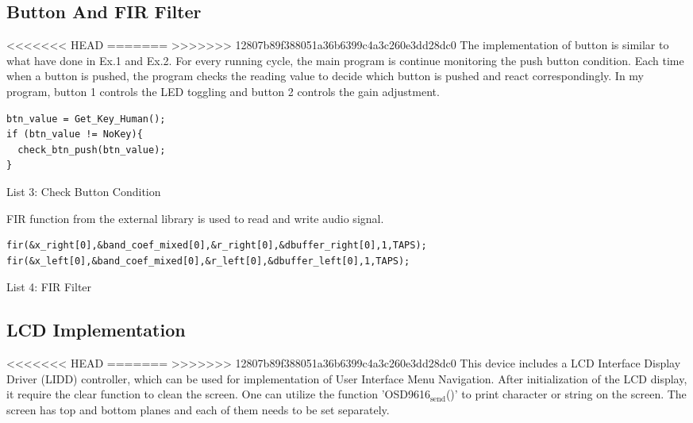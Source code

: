 \documentclass[titlepage]{article}
\begin{document}
\subsection{Button And FIR Filter}
<<<<<<< HEAD
\label{sec:orgec88205}
=======
\label{sec:orge8d06d4}
>>>>>>> 12807b89f388051a36b6399c4a3c260e3dd28dc0
The implementation of button is similar to what have done in
Ex.1 and Ex.2. For every running cycle, the main program is continue
monitoring the push button condition. Each time when a button is pushed, the
program checks the reading value to decide which button is pushed and react
correspondingly. In my program, button 1 controls the LED toggling and button
2 controls the gain adjustment.

\begin{listing}
\begin{verbatim}
btn_value = Get_Key_Human();
if (btn_value != NoKey){
  check_btn_push(btn_value);
}
\end{verbatim}
\centering
\caption{List 3: Check Button Condition}
\newline
\end{listing}

FIR function from the external library is used to read and write audio signal. 

\begin{listing}
\begin{verbatim}
fir(&x_right[0],&band_coef_mixed[0],&r_right[0],&dbuffer_right[0],1,TAPS);
fir(&x_left[0],&band_coef_mixed[0],&r_left[0],&dbuffer_left[0],1,TAPS);
\end{verbatim}
\centering
\caption{List 4: FIR Filter}
\newline
\end{listing}

\subsection{LCD Implementation}
<<<<<<< HEAD
\label{sec:org6be05da}
=======
\label{sec:org7ecad9b}
>>>>>>> 12807b89f388051a36b6399c4a3c260e3dd28dc0
This device includes a LCD Interface Display Driver (LIDD) controller, which
can be used for implementation of User Interface Menu Navigation. After
initialization of the LCD display, it require the clear function to clean the
screen. One can utilize the function 'OSD9616\(_{\text{send}}\)()' to print character or
string on the screen. The screen has top and bottom planes and each of them
needs to be set separately.
\end{document}
